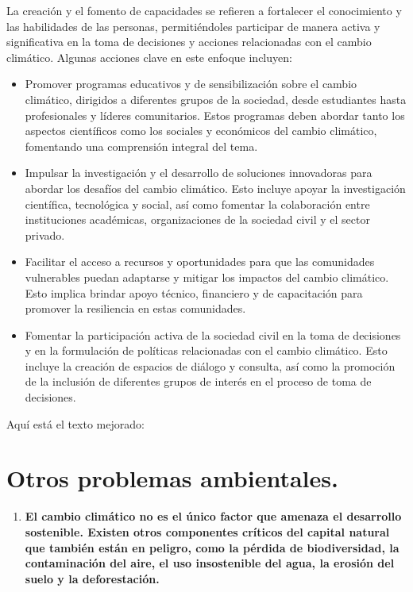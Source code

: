 \documentclass[
  a4paper,
]{article}
\providecommand{\tightlist}{%
  \setlength{\itemsep}{0pt}\setlength{\parskip}{0pt}}\usepackage{longtable,booktabs,array}
\begin{document}
La creación y el fomento de capacidades se refieren a fortalecer el
conocimiento y las habilidades de las personas, permitiéndoles
participar de manera activa y significativa en la toma de decisiones y
acciones relacionadas con el cambio climático. Algunas acciones clave en
este enfoque incluyen:

\begin{itemize}
\tightlist
\item
  Promover programas educativos y de sensibilización sobre el cambio
  climático, dirigidos a diferentes grupos de la sociedad, desde
  estudiantes hasta profesionales y líderes comunitarios. Estos
  programas deben abordar tanto los aspectos científicos como los
  sociales y económicos del cambio climático, fomentando una comprensión
  integral del tema.
\item
  Impulsar la investigación y el desarrollo de soluciones innovadoras
  para abordar los desafíos del cambio climático. Esto incluye apoyar la
  investigación científica, tecnológica y social, así como fomentar la
  colaboración entre instituciones académicas, organizaciones de la
  sociedad civil y el sector privado.
\item
  Facilitar el acceso a recursos y oportunidades para que las
  comunidades vulnerables puedan adaptarse y mitigar los impactos del
  cambio climático. Esto implica brindar apoyo técnico, financiero y de
  capacitación para promover la resiliencia en estas comunidades.
\item
  Fomentar la participación activa de la sociedad civil en la toma de
  decisiones y en la formulación de políticas relacionadas con el cambio
  climático. Esto incluye la creación de espacios de diálogo y consulta,
  así como la promoción de la inclusión de diferentes grupos de interés
  en el proceso de toma de decisiones.
\end{itemize}

Aquí está el texto mejorado:

\hypertarget{otros-problemas-ambientales.}{%
\section{Otros problemas
ambientales.}\label{otros-problemas-ambientales.}}

\begin{enumerate}
\def\labelenumi{\alph{enumi}.}
\tightlist
\item
  \textbf{El cambio climático no es el único factor que amenaza el
  desarrollo sostenible. Existen otros componentes críticos del capital
  natural que también están en peligro, como la pérdida de
  biodiversidad, la contaminación del aire, el uso insostenible del
  agua, la erosión del suelo y la deforestación.}
\end{enumerate}
\end{document}
